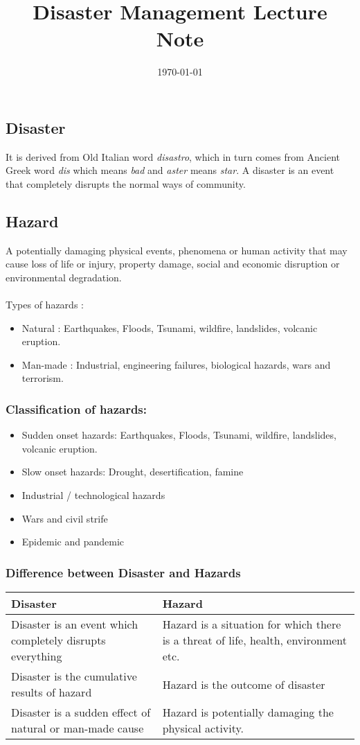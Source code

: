 \documentclass[12pt,a4paper]{article}
\title{Disaster Management Lecture Note \vspace{-2em}}
\date{\today}
\begin{document}
  \maketitle
  
\subsection*{Disaster}
It is derived from Old Italian word \textit{disastro}, which in turn comes from Ancient Greek word \textit{dis} which means \textit{bad} and \textit{aster} means \textit{star}. A disaster is an event that completely disrupts the normal ways of community.

\subsection*{Hazard}  
A potentially damaging physical events, phenomena or human activity that may cause loss of life or injury, property damage, social and economic disruption or environmental degradation. 
\\
\\
Types of hazards :
\begin{itemize}
	\item Natural : Earthquakes, Floods, Tsunami, wildfire, landslides, volcanic eruption.
	\item Man-made : Industrial, engineering failures, biological hazards, wars and terrorism.
\end{itemize}
\subsubsection*{Classification of hazards:} 
\begin{itemize}
	\item Sudden onset hazards: Earthquakes, Floods, Tsunami, wildfire, landslides, volcanic eruption.
	\item Slow onset hazards: Drought, desertification, famine 
	\item Industrial / technological hazards 
	\item Wars and civil strife
	\item Epidemic and pandemic
\end{itemize}

\subsubsection*{Difference between Disaster and Hazards}
\begin{center}
	\begin{tabular}{ p{60mm}|p{60mm} }
		\hline
		\textbf{Disaster} &  \textbf{Hazard} \\
		\hline
		Disaster is an event which completely disrupts everything & 
		Hazard is a situation for which there is a threat of life, health, environment etc. \\ 
		Disaster is the cumulative results of hazard & Hazard is the outcome of disaster \\  
		Disaster is a sudden effect of natural or man-made cause & Hazard is potentially damaging the physical activity.   
	\end{tabular}
\end{center}
\end{document}
